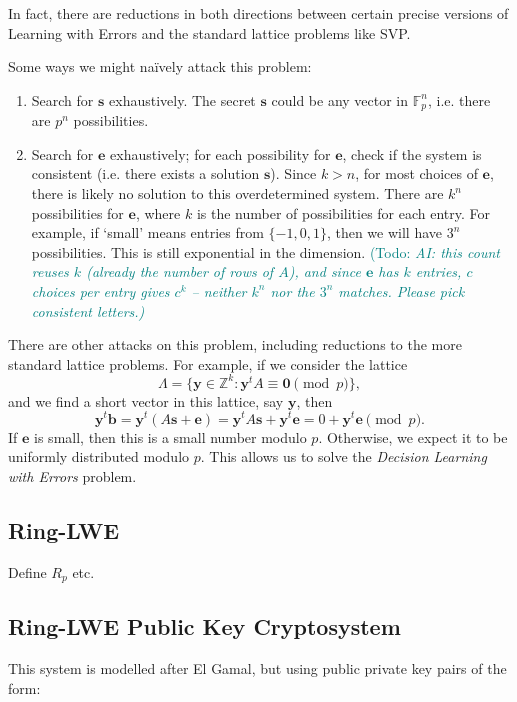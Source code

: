 \documentclass{article}
\theoremstyle{plain}
\theoremstyle{definition}
\theoremstyle{remark}
\numberwithin{theorem}{section}
\newcommand{\todo}[1]{\textcolor{teal}{{\sf (Todo:} {\sl{#1})}}}
\newcommand{\todo}[1]{}
\newcommand{\FF}{\mathbb{F}}
\newcommand{\ZZ}{\mathbb{Z}}
\begin{document}
In fact, there are reductions in both directions between certain precise versions of Learning with Errors and the standard lattice problems like SVP.


Some ways we might na\"ively attack this problem:
\begin{enumerate}
\item Search for $\mathbf{s}$ exhaustively.  The secret $\mathbf{s}$ could be any vector in $\FF_p^n$, i.e. there are $p^n$ possibilities.
\item Search for $\mathbf{e}$ exhaustively; for each possibility for $\mathbf{e}$, check if the system is consistent (i.e. there exists a solution $\mathbf{s}$).  Since $k > n$, for most choices of $\mathbf{e}$, there is likely no solution to this overdetermined system.  There are $k^n$ possibilities for $\mathbf{e}$, where $k$ is the number of possibilities for each entry.  For example, if `small' means entries from $\{ -1, 0, 1 \}$, then we will have $3^n$ possibilities.  This is still exponential in the dimension.  \todo{AI: this count reuses $k$ (already the number of rows of $A$), and since $\mathbf{e}$ has $k$ entries, $c$ choices per entry gives $c^k$ -- neither $k^n$ nor the $3^n$ matches.  Please pick consistent letters.}
\end{enumerate}

There are other attacks on this problem, including reductions to the more standard lattice problems.  For example, if we consider the lattice
\[
\Lambda = \{ 
\mathbf{y} \in \ZZ^k : \mathbf{y}^t A \equiv \mathbf{0} \pmod p \},
\]
and we find a short vector in this lattice, say $\mathbf{y}$, then
\[
\mathbf{y}^t \mathbf{b}
= 
\mathbf{y}^t (A\mathbf{s}  + \mathbf{e})
= 
\mathbf{y}^t A\mathbf{s} + 
\mathbf{y}^t \mathbf{e}
=
0
+ \mathbf{y}^t \mathbf{e} \pmod{p}.
\]
If $\mathbf{e}$ is small, then this is a small number modulo $p$.  Otherwise, we expect it to be uniformly distributed modulo $p$.  This allows us to solve the \emph{Decision Learning with Errors} problem.

\subsection{Ring-LWE}

Define $R_p$ etc.

\subsection{Ring-LWE Public Key Cryptosystem}

This system is modelled after El Gamal, but using public private key pairs of the form:
\end{document}
